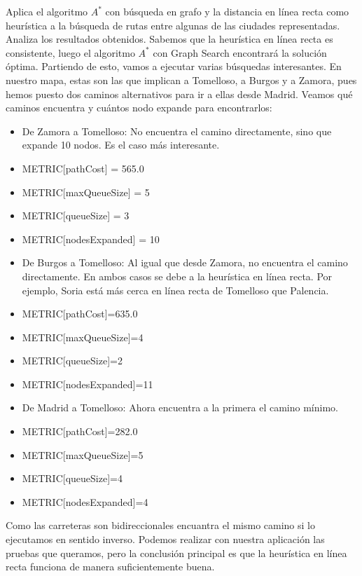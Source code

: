 \documentclass[11pt, a4paper, spanish, openright, twoside]{book}
\begin{document}
		\begin{section}{Aplica el algoritmo $A^*$ con búsqueda en grafo y la distancia en línea recta como heurística a la búsqueda de rutas entre algunas de las ciudades representadas. Analiza los resultados obtenidos.}
			Sabemos que la heurística en línea recta es consistente, luego el algoritmo $A^*$ con Graph Search encontrará la solución óptima. Partiendo de esto, vamos a ejecutar varias búsquedas interesantes. 
			En nuestro mapa, estas son las que implican a Tomelloso, a Burgos y a Zamora, pues hemos puesto dos caminos alternativos para ir a ellas desde Madrid. Veamos qué caminos encuentra y cuántos nodo expande para encontrarlos:
			
			\begin{itemize}
				\begin{itemize}
				\item De Zamora a Tomelloso: No encuentra el camino directamente, sino que expande 10 nodos. Es el caso más interesante.

					\item METRIC[pathCost] = 565.0
					\item METRIC[maxQueueSize] = 5
					\item METRIC[queueSize] = 3
					\item METRIC[nodesExpanded] = 10
				\end{itemize}

				\begin{itemize}
				\item De Burgos a Tomelloso: Al igual que desde Zamora, no encuentra el camino directamente. En ambos casos se debe a la heurística en línea recta. Por ejemplo, Soria está 
						más cerca en línea recta de Tomelloso que Palencia.

					\item METRIC[pathCost]=635.0
					\item METRIC[maxQueueSize]=4
					\item METRIC[queueSize]=2
					\item METRIC[nodesExpanded]=11
				\end{itemize}
			

				\begin{itemize}
				\item De Madrid a Tomelloso: Ahora encuentra a la primera el camino mínimo.
					\item METRIC[pathCost]=282.0
					\item METRIC[maxQueueSize]=5
					\item METRIC[queueSize]=4
					\item METRIC[nodesExpanded]=4
				\end{itemize}


				
			\end{itemize}

				Como las carreteras son bidireccionales encuantra el mismo camino si lo ejecutamos en sentido inverso. Podemos realizar con nuestra aplicación las pruebas que queramos, pero 
				la conclusión principal es que la heurística en línea recta funciona de manera suficientemente buena.
	\end{section}
	
\end{document}
